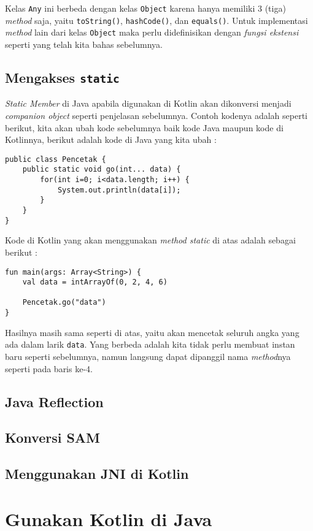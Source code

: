 Kelas \texttt{Any} ini berbeda dengan kelas \texttt{Object} karena hanya memiliki 3 (tiga) \textit{method} saja, yaitu \texttt{toString()}, \texttt{hashCode()}, dan \texttt{equals()}. Untuk implementasi \textit{method} lain dari kelas \texttt{Object} maka perlu didefinisikan dengan \textit{fungsi ekstensi} seperti yang telah kita bahas sebelumnya.

\subsection{Mengakses \texttt{static}}

\textit{Static Member} di Java apabila digunakan di Kotlin akan dikonversi menjadi \textit{companion object} seperti penjelasan sebelumnya. Contoh kodenya adalah seperti berikut, kita akan ubah kode sebelumnya baik kode Java maupun kode di Kotlinnya, berikut adalah kode di Java yang kita ubah :

\begin{lstlisting}
public class Pencetak {
	public static void go(int... data) {
		for(int i=0; i<data.length; i++) {
			System.out.println(data[i]);
		}
	}
}
\end{lstlisting}

Kode di Kotlin yang akan menggunakan \textit{method static} di atas adalah sebagai berikut :

\begin{lstlisting}
fun main(args: Array<String>) {
	val data = intArrayOf(0, 2, 4, 6)
	
	Pencetak.go("data")
}
\end{lstlisting}

Hasilnya masih sama seperti di atas, yaitu akan mencetak seluruh angka yang ada dalam larik \texttt{data}. Yang berbeda adalah kita tidak perlu membuat instan baru seperti sebelumnya, namun langsung dapat dipanggil nama \textit{method}nya seperti pada baris ke-4.

\subsection{Java Reflection}

\subsection{Konversi SAM}

\subsection{Menggunakan JNI di Kotlin}

\section{Gunakan Kotlin di Java}